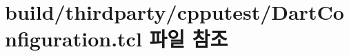 \hypertarget{build_2thirdparty_2cpputest_2_dart_configuration_8tcl}{}\section{build/thirdparty/cpputest/\+Dart\+Configuration.tcl 파일 참조}
\label{build_2thirdparty_2cpputest_2_dart_configuration_8tcl}
